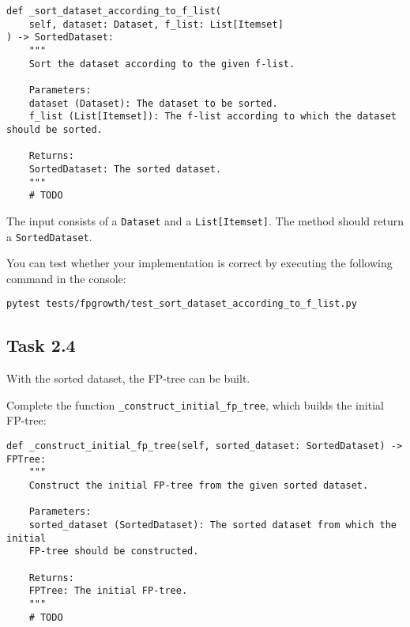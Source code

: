 \documentclass[
english,
smallborders
]{i6prcsht}
\begin{document}
\vspace*{0.3cm}

\begin{lstlisting}
def _sort_dataset_according_to_f_list(
	self, dataset: Dataset, f_list: List[Itemset]
) -> SortedDataset:
	"""
	Sort the dataset according to the given f-list.

	Parameters:
	dataset (Dataset): The dataset to be sorted.
	f_list (List[Itemset]): The f-list according to which the dataset should be sorted.

	Returns:
	SortedDataset: The sorted dataset.
	"""
	# TODO
\end{lstlisting}

\vspace*{0.1cm}

The input consists of a \texttt{Dataset} and a \texttt{List[Itemset]}. The method should return a \texttt{SortedDataset}.

You can test whether your implementation is correct by executing the following command in the console:

\vspace*{0.3cm}

\begin{lstlisting}
pytest tests/fpgrowth/test_sort_dataset_according_to_f_list.py
\end{lstlisting}

\vspace*{0.1cm}


\subsection*{Task 2.4}

With the sorted dataset, the FP-tree can be built.

Complete the function \texttt{\_construct\_initial\_fp\_tree}, which builds the
initial FP-tree:

\vspace*{0.3cm}

\begin{lstlisting}
def _construct_initial_fp_tree(self, sorted_dataset: SortedDataset) -> FPTree:
	"""
	Construct the initial FP-tree from the given sorted dataset.

	Parameters:
	sorted_dataset (SortedDataset): The sorted dataset from which the initial
	FP-tree should be constructed.

	Returns:
	FPTree: The initial FP-tree.
	"""
	# TODO
\end{lstlisting}
\end{document}
